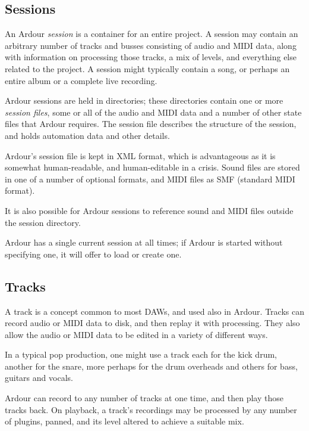 \documentclass[10pt,a4paper]{book}
\begin{document}
\subsection{Sessions}

An Ardour \emph{session} is a container for an entire project.  A
session may contain an arbitrary number of tracks and busses
consisting of audio and MIDI data, along with information on processing
those tracks, a mix of levels, and everything else related to the
project.  A session might typically contain a song, or perhaps an entire
album or a complete live recording.

Ardour sessions are held in directories; these directories contain one
or more \emph{session files}, some or all of the audio and MIDI data
and a number of other state files that Ardour requires.  The session
file describes the structure of the session, and holds automation data
and other details.

\begin{danger}
Ardour's session file is kept in XML format, which is advantageous as
it is somewhat human-readable, and human-editable in a crisis.  Sound
files are stored in one of a number of optional formats, and MIDI
files as SMF (standard MIDI format).

It is also possible for Ardour sessions to reference sound and MIDI
files outside the session directory.
\end{danger}

Ardour has a single current session at all times; if Ardour is started
without specifying one, it will offer to load or create one.



\subsection{Tracks}

A track is a concept common to most DAWs, and used also in Ardour.
Tracks can record audio or MIDI data to disk, and then replay it with
processing.  They also allow the audio or MIDI data to be edited in a
variety of different ways.

In a typical pop production, one might use a track each for the kick
drum, another for the snare, more perhaps for the drum overheads and
others for bass, guitars and vocals.

Ardour can record to any number of tracks at one time, and then play
those tracks back.  On playback, a track's recordings may be processed
by any number of plugins, panned, and its level altered to achieve a
suitable mix.
\end{document}
